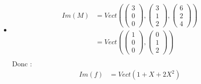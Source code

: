 \documentclass[../main.tex]{subfiles}
\begin{document}
\begin{itemize}
    \item \begin{align*}
        Im(M) &= Vect\left(\begin{pmatrix}
            3 \\
            0 \\
            0
        \end{pmatrix}, \begin{pmatrix}
            3 \\
            1 \\
            2
        \end{pmatrix}, \begin{pmatrix}
            6 \\
            2 \\
            4
        \end{pmatrix}\right) \\
        &= Vect\left(\begin{pmatrix}
            1 \\
            0 \\
            0
        \end{pmatrix}, \begin{pmatrix}
            0 \\
            1 \\
            2
        \end{pmatrix}\right) \\
    \end{align*}
    Donc : 
    \begin{align*}
        Im(f) &= Vect(1 + X + 2X^2)
    \end{align*}
\end{itemize}
\end{document}
